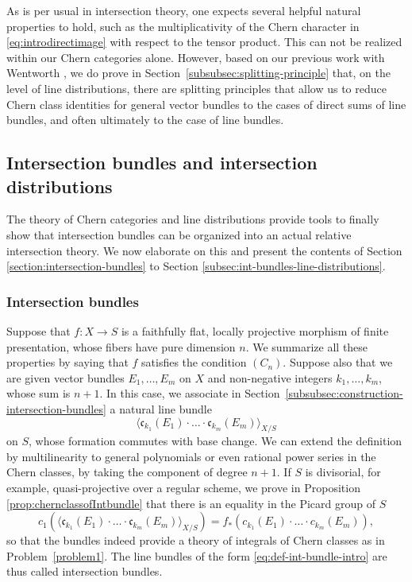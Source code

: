 \documentclass[JEP,XML,SOM,Unicode,published]{cedram}
\theoremstyle{plain}
\theoremstyle{definition}
\newcommand{\cfrak}{\mathfrak c}
\begin{document}
As is per usual in intersection theory, one expects several helpful natural properties to hold, such as the multiplicativity of the Chern character in \eqref{eq:introdirectimage} with respect to the tensor product. This can not be realized within our Chern categories alone. However, based on our previous work with Wentworth \cite{Eriksson-Freixas-Wentworth}, we do prove in Section~\ref{subsubsec:splitting-principle} that, on the level of line distributions, there are splitting principles that allow us to reduce Chern class identities for general vector bundles to the cases of direct sums of line bundles, and often ultimately to the case of line bundles.

\subsection{Intersection bundles and intersection distributions}
The theory of Chern categories and line distributions provide tools to finally show that intersection bundles can be organized into an actual relative intersection theory. We now elaborate on this and present the contents of Section \ref{section:intersection-bundles} to Section \ref{subsec:int-bundles-line-distributions}.

\subsubsection*{Intersection bundles} Suppose that $f: X \to S$ is a faithfully flat, locally projective morphism of finite presentation, whose fibers have pure dimension $n$. We summarize all these properties by saying that $f$ satisfies the condition $(C_{n})$. Suppose also that we are given vector bundles $E_1, \ldots, E_m$ on $X$ and non-negative integers $k_1, \ldots, k_m$, whose sum is $n+1$. In this case, we associate in Section~\ref{subsubsec:construction-intersection-bundles} a natural line bundle
\begin{equation}\label{eq:def-int-bundle-intro}
\langle \cfrak_{k_1}(E_1) \cdot \ldots \cdot \cfrak_{k_m}(E_m) \rangle_{X/S}
\end{equation}
on $S$, whose formation commutes with base change. We can extend the definition by multilinearity to general polynomials or even rational power series in the Chern classes, by taking the component of degree $n+1$. If $S$ is divisorial, for example, quasi-projective over a regular scheme, we prove in Proposition \ref{prop:chernclassofIntbundle} that there is an equality in the Picard group of $S$
\begin{equation}\label{eq:chern-classes-integral-intro}
c_1\left(\langle \cfrak_{k_1}(E_1) \cdot \ldots \cdot \cfrak_{k_m}(E_m) \rangle_{X/S}\right) = f_\ast \left( c_{k_1}(E_1) \cdot \ldots \cdot c_{k_m}(E_m) \right),
\end{equation}
so that the bundles indeed provide a theory of integrals of Chern classes as in Problem~\ref{problem1}. The line bundles of the form \eqref{eq:def-int-bundle-intro} are thus called intersection bundles.
\end{document}
